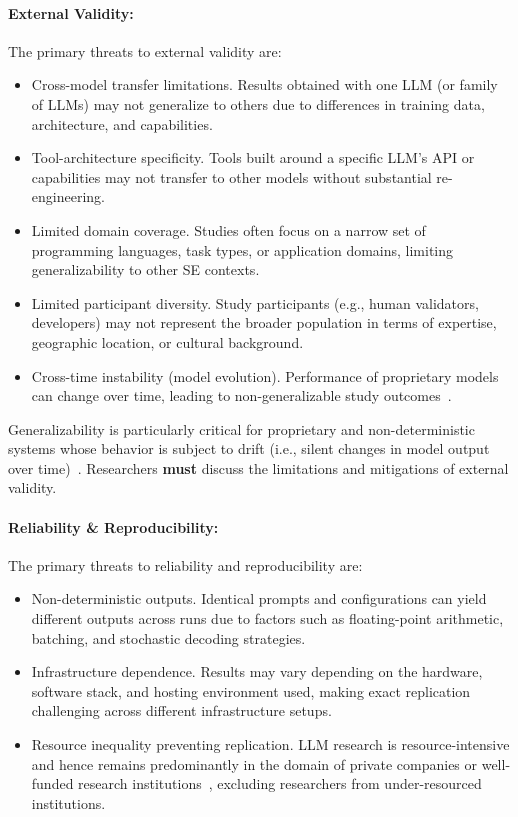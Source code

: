 \documentclass[smallextended]{svjour3}
\newcommand{\must}{\textbf{must}\xspace}
\begin{document}
\paragraph{External Validity:}
The primary threats to external validity are:
\begin{itemize}
    \item Cross-model transfer limitations. Results obtained with one LLM (or family of LLMs) may not generalize to others due to differences in training data, architecture, and capabilities.
    \item Tool-architecture specificity. Tools built around a specific LLM's API or capabilities may not transfer to other models without substantial re-engineering.
    \item Limited domain coverage. Studies often focus on a narrow set of programming languages, task types, or application domains, limiting generalizability to other SE contexts.
    \item Limited participant diversity. Study participants (e.g., human validators, developers) may not represent the broader population in terms of expertise, geographic location, or cultural background.
    \item Cross-time instability (model evolution). Performance of proprietary models can change over time, leading to non-generalizable study outcomes~\cite{DBLP:journals/corr/abs-2307-09009, doi:10.1148/radiol.232411}.
\end{itemize}

Generalizability is particularly critical for proprietary and non-deterministic systems whose behavior is subject to drift (i.e., silent changes in model output over time)~\cite{DBLP:journals/corr/abs-2307-09009}. Researchers \must discuss the limitations and mitigations of external validity.

\paragraph{Reliability \& Reproducibility:}
The primary threats to reliability and reproducibility are:
\begin{itemize}
    \item Non-deterministic outputs. Identical prompts and configurations can yield different outputs across runs due to factors such as floating-point arithmetic, batching, and stochastic decoding strategies.
    \item Infrastructure dependence. Results may vary depending on the hardware, software stack, and hosting environment used, making exact replication challenging across different infrastructure setups.
    \item Resource inequality preventing replication. LLM research is resource-intensive and hence remains predominantly in the domain of private companies or well-funded research institutions~\cite{schwartz2020green, ahmed2023industry}, excluding researchers from under-resourced institutions.
\end{itemize}
\end{document}
